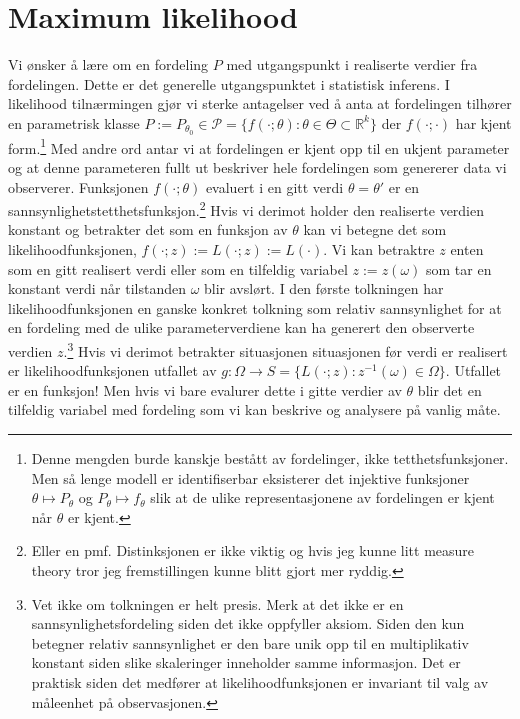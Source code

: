 \chapter{Maximum likelihood}
Vi ønsker å lære om en fordeling $P$ med utgangspunkt i realiserte verdier fra fordelingen. Dette er det generelle utgangspunktet i statistisk inferens. I likelihood tilnærmingen gjør vi sterke antagelser ved å anta at fordelingen tilhører en parametrisk klasse $P:=P_{\theta_0} \in \mathscr{P} = \{f(\cdot;\theta):\theta \in \Theta \subset \mathbb{R}^k\}$ der $f(\cdot;\cdot)$ har kjent form.\footnote{Denne mengden burde kanskje bestått av fordelinger, ikke tetthetsfunksjoner. Men så lenge modell er identifiserbar eksisterer det injektive funksjoner $\theta \mapsto P_{\theta}$ og $P_{\theta} \mapsto f_{\theta}$ slik at de ulike representasjonene av fordelingen er kjent når $\theta$ er kjent.} Med andre ord antar vi at fordelingen er kjent opp til en ukjent parameter og at denne parameteren fullt ut beskriver hele fordelingen som genererer data vi observerer. Funksjonen $f(\cdot;\theta)$ evaluert i en gitt verdi $\theta=\theta'$ er en sannsynlighetstetthetsfunksjon.\footnote{Eller en pmf. Distinksjonen er ikke viktig og hvis jeg kunne litt measure theory tror jeg fremstillingen kunne blitt gjort mer ryddig.} Hvis vi derimot holder den realiserte verdien konstant og betrakter det som en funksjon av $\theta$ kan vi betegne det som likelihoodfunksjonen, $f(\cdot;z):=L(\cdot;z) := L(\cdot)$. Vi kan betraktre $z$ enten som en gitt realisert verdi eller som en tilfeldig variabel $z:=z(\omega)$ som tar en konstant verdi når tilstanden $\omega$ blir avslørt. I den første tolkningen har likelihoodfunksjonen en ganske konkret tolkning som relativ sannsynlighet for at en fordeling med de ulike parameterverdiene kan ha generert den observerte verdien $z$.\footnote{Vet ikke om tolkningen er helt presis. Merk at det ikke er en sannsynlighetsfordeling siden det ikke oppfyller aksiom. Siden den kun betegner relativ sannsynlighet er den bare unik opp til en multiplikativ konstant siden slike skaleringer inneholder samme informasjon.  Det er praktisk siden det medfører at likelihoodfunksjonen er invariant til valg av måleenhet på observasjonen.} Hvis vi derimot betrakter situasjonen situasjonen før verdi er realisert er likelihoodfunksjonen utfallet av $g:\Omega \to S = \{L(\cdot;z):z^{-1}(\omega) \in \Omega\}$. Utfallet er en funksjon! Men hvis vi bare evalurer dette i gitte verdier av $\theta$ blir det en tilfeldig variabel med fordeling som vi kan beskrive og analysere på vanlig måte. 

